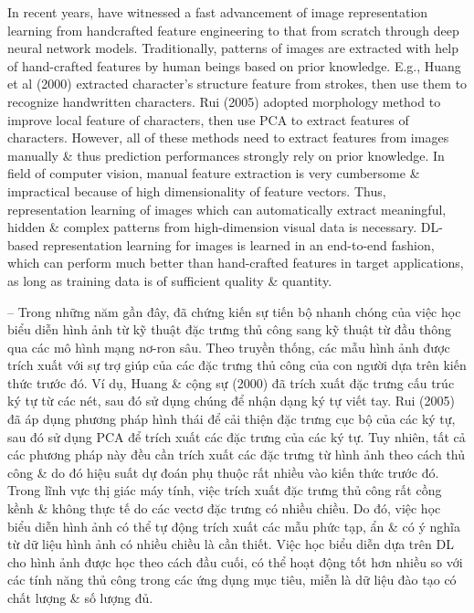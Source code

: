 \documentclass{article}
\begin{document}
\begin{itemize}
\begin{itemize}
\begin{itemize}
            In recent years, have witnessed a fast advancement of image representation learning from handcrafted feature engineering to that from scratch through deep neural network models. Traditionally, patterns of images are extracted with help of hand-crafted features by human beings based on prior knowledge. E.g., Huang et al (2000) extracted character's structure feature from strokes, then use them to recognize handwritten characters. Rui (2005) adopted morphology method to improve local feature of characters, then use PCA to extract features of characters. However, all of these methods need to extract features from images manually \& thus prediction performances strongly rely on prior knowledge. In field of computer vision, manual feature extraction is very cumbersome \& impractical because of high dimensionality of feature vectors. Thus, representation learning of images which can automatically extract meaningful, hidden \& complex patterns from high-dimension visual data is necessary. DL-based representation learning for images is learned in an end-to-end fashion, which can perform much better than hand-crafted features in target applications, as long as training data is of sufficient quality \& quantity.

            -- Trong những năm gần đây, đã chứng kiến sự tiến bộ nhanh chóng của việc học biểu diễn hình ảnh từ kỹ thuật đặc trưng thủ công sang kỹ thuật từ đầu thông qua các mô hình mạng nơ-ron sâu. Theo truyền thống, các mẫu hình ảnh được trích xuất với sự trợ giúp của các đặc trưng thủ công của con người dựa trên kiến thức trước đó. Ví dụ, Huang \& cộng sự (2000) đã trích xuất đặc trưng cấu trúc ký tự từ các nét, sau đó sử dụng chúng để nhận dạng ký tự viết tay. Rui (2005) đã áp dụng phương pháp hình thái để cải thiện đặc trưng cục bộ của các ký tự, sau đó sử dụng PCA để trích xuất các đặc trưng của các ký tự. Tuy nhiên, tất cả các phương pháp này đều cần trích xuất các đặc trưng từ hình ảnh theo cách thủ công \& do đó hiệu suất dự đoán phụ thuộc rất nhiều vào kiến thức trước đó. Trong lĩnh vực thị giác máy tính, việc trích xuất đặc trưng thủ công rất cồng kềnh \& không thực tế do các vectơ đặc trưng có nhiều chiều. Do đó, việc học biểu diễn hình ảnh có thể tự động trích xuất các mẫu phức tạp, ẩn \& có ý nghĩa từ dữ liệu hình ảnh có nhiều chiều là cần thiết. Việc học biểu diễn dựa trên DL cho hình ảnh được học theo cách đầu cuối, có thể hoạt động tốt hơn nhiều so với các tính năng thủ công trong các ứng dụng mục tiêu, miễn là dữ liệu đào tạo có chất lượng \& số lượng đủ.


\end{itemize}
\end{itemize}
\end{itemize}
\end{document}
